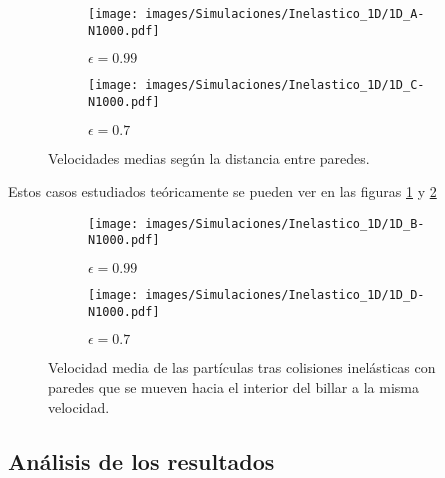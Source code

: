 \begin{figure}[H]
    \begin{subfigure}[b]{0.49\textwidth}
        \centering
        \texttt{[image: images/Simulaciones/Inelastico\_1D/1D\_A-N1000.pdf]}
        \caption{$\epsilon = 0.99$}
    \end{subfigure}
    \hfill
    \begin{subfigure}[b]{0.5\textwidth}
        \centering
        \texttt{[image: images/Simulaciones/Inelastico\_1D/1D\_C-N1000.pdf]}
        \caption{$\epsilon = 0.7$}
    \end{subfigure}
    \caption{Velocidades medias según la distancia entre paredes.}
    \label{fig:1D_inelastic_A}
\end{figure}

\vspace{3mm}

Estos casos estudiados teóricamente se pueden ver en las figuras \ref{fig:1D_inelastic_A} y \ref{fig:1D_inelastic_B} 

\begin{figure}[H]
    \begin{subfigure}[b]{0.5\textwidth}
        \centering
        \texttt{[image: images/Simulaciones/Inelastico\_1D/1D\_B-N1000.pdf]}
        \caption{$\epsilon = 0.99$}
    \end{subfigure}
    \hfill
    \begin{subfigure}[b]{0.5\textwidth}
        \centering
        \texttt{[image: images/Simulaciones/Inelastico\_1D/1D\_D-N1000.pdf]}
        \caption{$\epsilon = 0.7$}
    \end{subfigure}
    \caption{Velocidad media de las partículas tras colisiones inelásticas con paredes que se mueven hacia el interior del billar a la misma velocidad.}
    \label{fig:1D_inelastic_B}
\end{figure}

\subsection{Análisis de los resultados}

